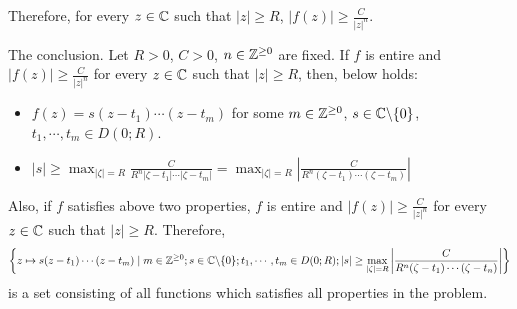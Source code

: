 Therefore, for every \(z \in \mathbb{C}\) such that \(|z| \ge R\), \(|f(z)| \ge \frac{C}{|z|^n}\).
\newline

The conclusion.
Let \(R > 0\), \(C > 0\), \(n \in \mathbb{Z}^{\ge 0}\) are fixed.
If \(f\) is entire and \(\left|f(z)\right| \ge \frac{C}{\left|z\right|^n}\)
for every \(z \in \mathbb{C}\) such that \(\left|z\right| \ge R\),
then, below holds:
\begin{itemize}
\item \(f(z) = s(z - t_1) \cdots (z - t_m)\) for some \(m \in \mathbb{Z}^{\ge 0}\), \(s \in \bbC \bs \{0\}\), \(t_1, \cdots, t_m \in D(0; R)\).
\item \(|s| \ge \max_{|\zeta| = R} \frac{C}{R^n |\zeta - t_1| \cdots |\zeta - t_m|}
    = \max_{|\zeta| = R} \left| \frac{C}{R^n (\zeta - t_1) \cdots (\zeta - t_m)} \right|\)
\end{itemize}
Also, if \(f\) satisfies above two properties,
\(f\) is entire and
\(\left|f(z)\right| \ge \frac{C}{\left|z\right|^n}\)
for every \(z \in \mathbb{C}\) such that \(\left|z\right| \ge R\).
Therefore,
\[\left\{
  z \mapsto s(z - t_1) \cdots (z - t_m) \mid
  m \in \bbZ^{\ge 0};
  s \in \bbC \bs \{0\};
  t_1, \cdots, t_m \in D(0; R);
  |s| \ge \max_{|\zeta| = R} \left| \frac{C}{R^n (\zeta - t_1) \cdots (\zeta - t_n)} \right|
  \right\}\]
is a set consisting of all functions which satisfies all properties in the problem.
\qedsq